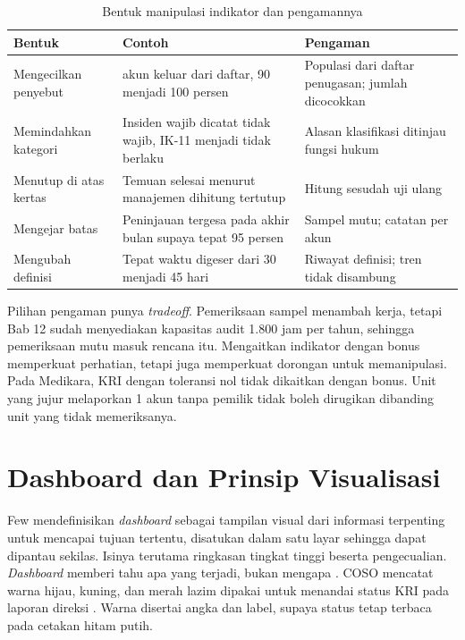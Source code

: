 \begin{table}[!htb]
  \centering\small
  \caption{Bentuk manipulasi indikator dan pengamannya}\label{tab:ch13-manipulasi}
  \begin{tabularx}{\textwidth}{|>{\raggedright\arraybackslash}p{}|>{\raggedright\arraybackslash}X|>{\raggedright\arraybackslash}X|}
    \hline
    \textbf{Bentuk} & \textbf{Contoh} & \textbf{Pengaman} \\ \hline
    Mengecilkan penyebut & 12 akun keluar dari daftar, 90 menjadi 100 persen & Populasi dari daftar
    penugasan; jumlah dicocokkan \\ \hline
    Memindahkan kategori & Insiden wajib dicatat tidak wajib, IK-11 menjadi tidak berlaku & Alasan
    klasifikasi ditinjau fungsi hukum \\ \hline
    Menutup di atas kertas & Temuan selesai menurut manajemen dihitung tertutup & Hitung sesudah uji
    ulang \\ \hline
    Mengejar batas & Peninjauan tergesa pada akhir bulan supaya tepat 95 persen & Sampel mutu;
    catatan per akun \\ \hline
    Mengubah definisi & Tepat waktu digeser dari 30 menjadi 45 hari & Riwayat definisi; tren tidak
    disambung \\ \hline
  \end{tabularx}
\end{table}

Pilihan pengaman punya \textit{tradeoff}. Pemeriksaan sampel menambah kerja, tetapi Bab 12 sudah
menyediakan kapasitas audit 1.800 jam per tahun, sehingga pemeriksaan mutu masuk rencana itu.
Mengaitkan indikator dengan bonus memperkuat perhatian, tetapi juga memperkuat dorongan untuk
memanipulasi. Pada Medikara, KRI dengan toleransi nol tidak dikaitkan dengan bonus. Unit yang jujur
melaporkan 1 akun tanpa pemilik tidak boleh dirugikan dibanding unit yang tidak memeriksanya.

\section{Dashboard dan Prinsip Visualisasi}

Few mendefinisikan \textit{dashboard} sebagai tampilan visual dari informasi terpenting untuk
mencapai tujuan tertentu, disatukan dalam satu layar sehingga dapat dipantau sekilas. Isinya
terutama ringkasan tingkat tinggi beserta pengecualian. \textit{Dashboard} memberi tahu apa yang
terjadi, bukan mengapa \cite{c13-few2004}. COSO mencatat warna hijau, kuning, dan merah lazim
dipakai untuk menandai status KRI pada laporan direksi \cite{c13-coso-kri}. Warna disertai angka dan
label, supaya status tetap terbaca pada cetakan hitam putih.

